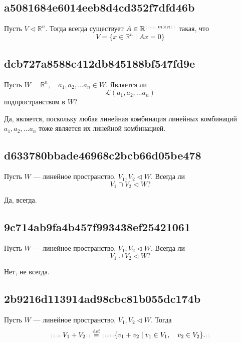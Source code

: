 \documentclass[11pt, a5paper]{article}
\newenvironment{note}[1]{\goodbreak\par\subsection{\hfill \color{lightgray}\tiny #1}}{}
\newenvironment{cloze}[2][\ldots]{\begin{leftbar}}{\end{leftbar}}
\newenvironment{icloze}[2][\ldots]{%
  \ignorespaces\text{\tiny \color{lightgray} \{\{c#2::}\hspace{0pt}%
}{%
  \hspace{0pt}\text{\tiny \color{lightgray}\}\}}\unskip%
}
\begin{document}
\begin{note}{a5081684e6014eeb8d4cd352f7dfd46b}
    Пусть \( V \triangleleft \mathbb R ^{n}. \) Тогда всегда существует \( A \in \mathbb R ^{\begin{icloze}{2}m \times n\end{icloze}}  \) такая, что
    \begin{icloze}{1}\[
        V = \{ x \in \mathbb R ^{n}  \mid Ax = 0  \}
    \]\end{icloze}
\end{note}

\begin{note}{dcb727a8588c412db845188bf547fd9e}
    Пусть \( W = \mathbb R ^{n}, \quad a_1, a_2, \ldots a_n \in W. \) Является ли
    \[
        \mathscr L (a_1, a_2, \ldots a_n)
    \]
    подпространством в \( W \)?

    \begin{cloze}{1}
        Да, является, поскольку любая линейная комбинация линейных комбинаций \( a_1, a_2, \ldots a_n  \)  тоже является их линейной комбинацией.
    \end{cloze}
\end{note}

\begin{note}{d633780bbade46968c2bcb66d05be478}
    Пусть \( W \) --- линейное пространство, \( V_1, V_2 \triangleleft W \).
    Всегда ли
    \[
        V_1 \cap V_2 \triangleleft W?
    \]


    \begin{cloze}{1}
        Да, всегда.
    \end{cloze}
\end{note}

\begin{note}{9c714ab9fa4b457f993438ef25421061}
    Пусть \( W \) --- линейное пространство, \( V_1, V_2 \triangleleft W \).
    Всегда ли
    \[
        V_1 \cup V_2 \triangleleft W?
    \]

    \begin{cloze}{1}
        Нет, не всегда.
    \end{cloze}
\end{note}

\begin{note}{2b9216d113914ad98cbc81b055dc174b}
    Пусть \( W \) --- линейное пространство, \( V_1, V_2 \triangleleft W \).
    Тогда
    \[
        \begin{icloze}{2}V_1 + V_2\end{icloze} \overset{\text{def}}= \begin{icloze}{1}
            \{ v_1 + v_2 \mid v_1 \in V_1, \quad v_2 \in V_2 \} .
        \end{icloze}
    \]
\end{note}
\end{document}
